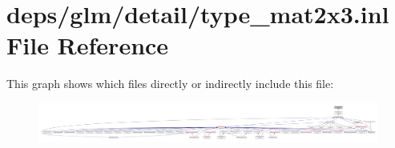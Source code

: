 \hypertarget{type__mat2x3_8inl}{}\section{deps/glm/detail/type\+\_\+mat2x3.inl File Reference}
\label{type__mat2x3_8inl}
This graph shows which files directly or indirectly include this file\+:
\nopagebreak
\begin{figure}[H]
\begin{center}
\leavevmode
\includegraphics[width=350pt]{dd/d9b/type__mat2x3_8inl__dep__incl}
\end{center}
\end{figure}
